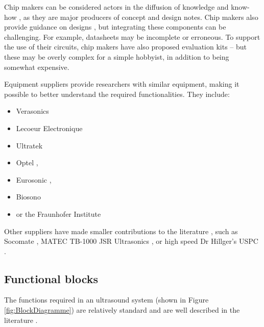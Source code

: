 \documentclass{article}
\begin{document}
Chip makers can be considered actors in the diffusion of knowledge and know-how \cite{brunner_how_2002, xu_challenges_2010}, as they are major producers of concept and design notes. Chip makers also provide guidance on designs \cite{ching_chu_designing_nodate}, but integrating these components can be challenging. For example, datasheets may be incomplete or erroneous. To support the use of their circuits, chip makers have also proposed evaluation kits -- but these may be overly complex for a simple hobbyist, in addition to being somewhat expensive.

Equipment suppliers provide researchers with similar equipment, making it possible to better understand the required functionalities. They include:
\begin{itemize}
\item
Verasonics \cite{peyton_front-end_2017, george_portable_2018, kang_new_2017, hager_ultralight:_2017} 
\item Lecoeur Electronique \cite{lecoeur_bluetooth_nodate, tortoli_ula-op:_2009, zhang_toward_2018, al-aufi_thin_2019}
\item Ultratek \cite{veenstra_generating_nodate, perez-sanchez_numerical_2020, chen_ultrasound_2016, wang_preliminary_2019}
\item Optel \cite{ scholle_pulse_2018, ratajski_application_2017, nowak_evaluation_2020, karjalainen_multi-site_2012},
\item Eurosonic \cite{jin_optimization_2017, mostavi_application_2017, ranachowski_mechanical_2020, vadalma_smartphone_2020}, 
\item Biosono \cite{biosono_sonolab_nodate} 
\item or  the Fraunhofer Institute \cite{zimmermann_highly_2019, zimmermann_miniaturized_2018, zimmermann_high_2018} 
\end{itemize}

Other suppliers have made smaller contributions to the literature \cite{ozdemir_remote_2018}, such as Socomate \cite{gil-alba_morphological_2019}, MATEC TB-1000 \cite{kielczynski_thermophysical_2017} JSR Ultrasonics \cite{cramer_ultrasonic_2015}, or high speed Dr Hillger's USPC \cite{hillger_high_2016}. 

\subsection{Functional blocks}

The functions required in an ultrasound system (shown in Figure \ref{fig:BlockDiagramme}) are relatively standard and are well described in the literature \cite{murtaza_ali_signal_2008}.
\end{document}
